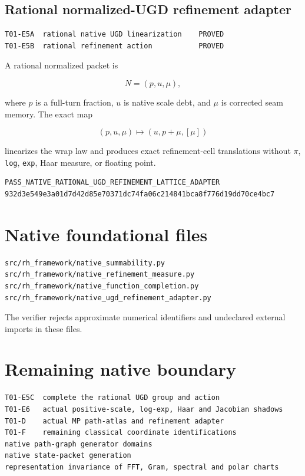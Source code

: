 \hypertarget{rational-normalized-ugd-refinement-adapter}{%
\subsection{Rational normalized-UGD refinement adapter}\label{rational-normalized-ugd-refinement-adapter}}

\begin{verbatim}
T01-E5A  rational native UGD linearization    PROVED
T01-E5B  rational refinement action           PROVED
\end{verbatim}

A rational normalized packet is

\[
N=(p,u,\mu),
\]

where \(p\) is a full-turn fraction, \(u\) is native scale debt, and \(\mu\)
is corrected seam memory. The exact map

\[
(p,u,\mu)\mapsto(u,p+\mu,[\mu])
\]

linearizes the wrap law and produces exact refinement-cell translations without
\(\pi\), \texttt{log}, \texttt{exp}, Haar measure, or floating point.

\begin{verbatim}
PASS_NATIVE_RATIONAL_UGD_REFINEMENT_LATTICE_ADAPTER
932d3e549e3a01d7d42d85e70371dc74fa06c214841bca8f776d19dd70ce4bc7
\end{verbatim}

\hypertarget{native-foundational-files}{%
\section{Native foundational files}\label{native-foundational-files}}

\begin{verbatim}
src/rh_framework/native_summability.py
src/rh_framework/native_refinement_measure.py
src/rh_framework/native_function_completion.py
src/rh_framework/native_ugd_refinement_adapter.py
\end{verbatim}

The verifier rejects approximate numerical identifiers and undeclared external
imports in these files.

\hypertarget{remaining-native-boundary}{%
\section{Remaining native boundary}\label{remaining-native-boundary}}

\begin{verbatim}
T01-E5C  complete the rational UGD group and action
T01-E6   actual positive-scale, log-exp, Haar and Jacobian shadows
T01-D    actual MP path-atlas and refinement adapter
T01-F    remaining classical coordinate identifications
native path-graph generator domains
native state-packet generation
representation invariance of FFT, Gram, spectral and polar charts
\end{verbatim}

